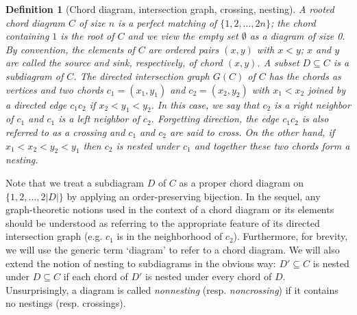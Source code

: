 

\newtheorem{definition}{Definition}[section]

\newtheorem{theorem}[definition]{Theorem}
\newtheorem{proposition}[definition]{Proposition}
\newtheorem{lemma}[definition]{Lemma}
\newtheorem{corollary}[definition]{Corollary}
\newtheorem{conjecture}[definition]{Conjecture}

\newcommand{\Int}{\textnormal{Int}}

\begin{definition}[Chord diagram, intersection graph, crossing, nesting]
A {\em rooted chord diagram $C$} of size $n$ is a perfect matching of $\{1, 2, \ldots, 2n\}$; the chord containing $1$ is the {\em root} of $C$ and we view the empty set $\emptyset$ as a diagram of size 0. By convention, the elements of $C$ are ordered pairs $(x, y)$ with $x < y$; $x$ and $y$ are called the {\em source} and {\em sink}, respectively, of chord $(x, y)$. A subset $D \subseteq C$ is a {\em subdiagram} of $C$. The {\em directed intersection graph $G(C)$ of $C$} has the chords as vertices and two chords $c_{1} = (x_{1}, y_{1})$ and $c_{2} = (x_{2}, y_{2})$ with $x_{1} < x_{2}$ joined by a directed edge $c_{1}c_{2}$ if $x_{2} < y_{1} < y_{2}$. In this case, we say that $c_{2}$ is a {\em right neighbor of $c_{1}$} and $c_{1}$ is a {\em left neighbor of $c_{2}$}. Forgetting direction, the edge $c_{1}c_{2}$ is also referred to as a {\em crossing} and $c_{1}$ and $c_{2}$ are said to {\em cross}. On the other hand, if $x_{1} < x_{2} < y_{2} < y_{1}$ then $c_{2}$ is {\em nested under $c_{1}$} and together these two chords form a {\em nesting}.  
\end{definition}

Note that we treat a subdiagram $D$ of $C$ as a proper chord diagram on $\{1, 2, \ldots, 2|D|\}$ by applying an order-preserving bijection. In the sequel, any graph-theoretic notions used in the context of a chord diagram or its elements should be understood as referring to the appropriate feature of its directed intersection graph (e.g. $c_{1}$ is in the neighborhood of $c_{2}$). Furthermore, for brevity, we will use the generic term `diagram' to refer to a chord diagram. We will also extend the notion of nesting to subdiagrams in the obvious way: $D' \subseteq C$ is nested under $D \subseteq C$ if each chord of $D'$ is nested under every chord of $D$. Unsurprisingly, a diagram is called {\em nonnesting} (resp. {\em noncrossing}) if it contains no nestings (resp. crossings).  

